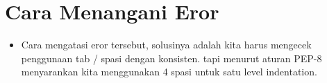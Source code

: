 \documentclass{article}
\begin{document}
\section{Cara Menangani Eror}
\usepackage{IndentationError: unindent does not match any outer indentation level}

\begin{itemize}
    \item Cara mengatasi eror tersebut, solusinya adalah kita harus mengecek penggunaan tab / spasi dengan konsisten. tapi menurut aturan PEP-8 menyarankan kita menggunakan 4 spasi untuk satu level indentation.
\end{itemize}
\end{document}
